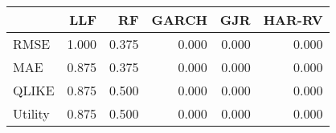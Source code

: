 \begin{tabular}{lrrrrr}
\toprule
 & LLF & RF & GARCH & GJR & HAR-RV \\
\midrule
RMSE & 1.000 & 0.375 & 0.000 & 0.000 & 0.000 \\
MAE & 0.875 & 0.375 & 0.000 & 0.000 & 0.000 \\
QLIKE & 0.875 & 0.500 & 0.000 & 0.000 & 0.000 \\
Utility & 0.875 & 0.500 & 0.000 & 0.000 & 0.000 \\
\bottomrule
\end{tabular}
